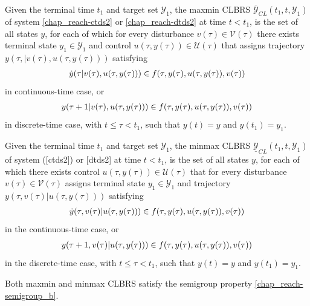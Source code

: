 \documentclass[letterpaper,10pt,english]{sphinxmanual}
\begin{document}
Given the terminal time $t_1$ and
target set ${\mathcal Y}_1$, the maxmin CLBRS
$\overline{{\mathcal Y}}_{CL}(t_1, t, {\mathcal Y}_1)$ of system
\eqref{chap_reach-ctds2} or \eqref{chap_reach-dtds2} at time $t<t_1$, is the set of all states
$y$, for each of which for every disturbance
$v(\tau)\in{\mathcal V}(\tau)$ there exists terminal state
$y_1\in{\mathcal Y}_1$ and control
$u(\tau, y(\tau))\in{\mathcal U}(\tau)$ that assigns trajectory
$y(\tau, | v(\tau), u(\tau, y(\tau)))$ satisfying
\begin{gather}
\begin{split}\dot{y}(\tau | v(\tau), u(\tau, y(\tau))) \in
f(\tau, y(\tau), u(\tau, y(\tau)), v(\tau))\end{split}\notag
\end{gather}
in continuous-time case, or
\begin{gather}
\begin{split}y(\tau+1 | v(\tau), u(\tau, y(\tau))) \in
f(\tau, y(\tau), u(\tau, y(\tau)), v(\tau))\end{split}\notag
\end{gather}
in discrete-time case, with $t\leqslant\tau<t_1$, such that
$y(t) = y$ and $y(t_1)=y_1$.

Given the terminal time $t_1$ and target set ${\mathcal Y}_1$, the
minmax CLBRS $\underline{{\mathcal Y}}_{CL}(t_1, t, {\mathcal Y}_1)$ of system
({[}ctds2{]}) or {[}dtds2{]} at time $t<t_1$, is the set of all states
$y$, for each of which there exists control
$u(\tau, y(\tau))\in{\mathcal U}(\tau)$ that for every disturbance
$v(\tau)\in{\mathcal V}(\tau)$ assigns terminal state
$y_1\in{\mathcal Y}_1$ and trajectory
$y(\tau, v(\tau) | u(\tau, y(\tau)))$ satisfying
\begin{gather}
\begin{split}\dot{y}(\tau, v(\tau) | u(\tau, y(\tau))) \in
f(\tau, y(\tau), u(\tau, y(\tau)), v(\tau))\end{split}\notag
\end{gather}
in the continuous-time case, or
\begin{gather}
\begin{split}y(\tau+1, v(\tau) | u(\tau, y(\tau))) \in
f(\tau, y(\tau), u(\tau, y(\tau)), v(\tau))\end{split}\notag
\end{gather}
in the discrete-time case, with $t\leqslant\tau<t_1$, such that
$y(t) = y$ and $y(t_1)=y_1$.

Both
maxmin and minmax CLBRS satisfy the semigroup property
\eqref{chap_reach-semigroup_b}.
\end{document}

